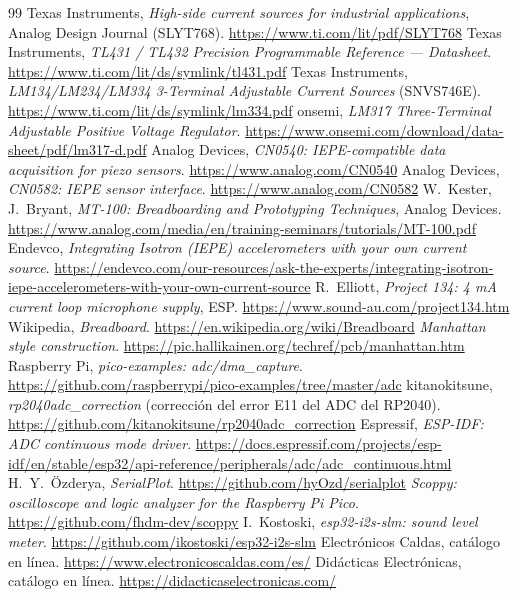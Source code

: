 \documentclass[11pt,a4paper]{article}
\begin{document}
\begin{thebibliography}{99}
 Texas Instruments, \emph{High-side current sources for industrial applications}, Analog Design Journal (SLYT768). \url{https://www.ti.com/lit/pdf/SLYT768}
 Texas Instruments, \emph{TL431 / TL432 Precision Programmable Reference — Datasheet}. \url{https://www.ti.com/lit/ds/symlink/tl431.pdf}
 Texas Instruments, \emph{LM134/LM234/LM334 3-Terminal Adjustable Current Sources} (SNVS746E). \url{https://www.ti.com/lit/ds/symlink/lm334.pdf}
 onsemi, \emph{LM317 Three-Terminal Adjustable Positive Voltage Regulator}. \url{https://www.onsemi.com/download/data-sheet/pdf/lm317-d.pdf}
 Analog Devices, \emph{CN0540: IEPE-compatible data acquisition for piezo sensors}. \url{https://www.analog.com/CN0540}
 Analog Devices, \emph{CN0582: IEPE sensor interface}. \url{https://www.analog.com/CN0582}
 W.~Kester, J.~Bryant, \emph{MT-100: Breadboarding and Prototyping Techniques}, Analog Devices. \url{https://www.analog.com/media/en/training-seminars/tutorials/MT-100.pdf}
 Endevco, \emph{Integrating Isotron (IEPE) accelerometers with your own current source}. \url{https://endevco.com/our-resources/ask-the-experts/integrating-isotron-iepe-accelerometers-with-your-own-current-source}
 R.~Elliott, \emph{Project 134: 4 mA current loop microphone supply}, ESP. \url{https://www.sound-au.com/project134.htm}
 Wikipedia, \emph{Breadboard}. \url{https://en.wikipedia.org/wiki/Breadboard}
 \emph{Manhattan style construction}. \url{https://pic.hallikainen.org/techref/pcb/manhattan.htm}
 Raspberry Pi, \emph{pico-examples: adc/dma\_capture}. \url{https://github.com/raspberrypi/pico-examples/tree/master/adc}
 kitanokitsune, \emph{rp2040adc\_correction} (corrección del error E11 del ADC del RP2040). \url{https://github.com/kitanokitsune/rp2040adc_correction}
 Espressif, \emph{ESP-IDF: ADC continuous mode driver}. \url{https://docs.espressif.com/projects/esp-idf/en/stable/esp32/api-reference/peripherals/adc/adc_continuous.html}
 H.~Y.~Özderya, \emph{SerialPlot}. \url{https://github.com/hyOzd/serialplot}
 \emph{Scoppy: oscilloscope and logic analyzer for the Raspberry Pi Pico}. \url{https://github.com/fhdm-dev/scoppy}
 I.~Kostoski, \emph{esp32-i2s-slm: sound level meter}. \url{https://github.com/ikostoski/esp32-i2s-slm}
 Electrónicos Caldas, catálogo en línea. \url{https://www.electronicoscaldas.com/es/}
 Didácticas Electrónicas, catálogo en línea. \url{https://didacticaselectronicas.com/}
\end{thebibliography}
\end{document}
